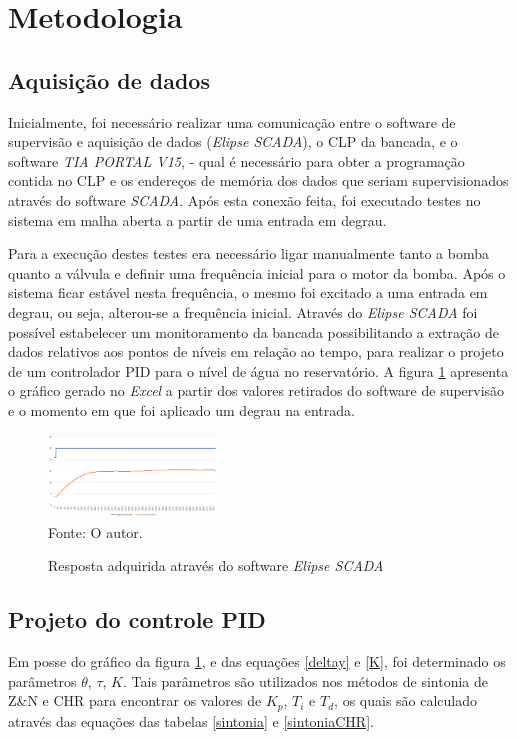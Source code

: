\documentclass[12 pt,conference]{IEEEtran}
\begin{document}
    
    \section{Metodologia}
    
    \subsection{Aquisição de dados}
    
    Inicialmente, foi necessário realizar uma comunicação entre o software de supervisão e aquisição de dados (\textit{Elipse SCADA}), o CLP da bancada, e o software \textit{TIA PORTAL V15}, - qual é necessário para obter a programação contida no CLP e os endereços de memória dos dados que seriam supervisionados através do software \textit{SCADA}. Após esta conexão feita, foi executado testes no sistema em malha aberta a partir de uma entrada em degrau.
    
    Para a execução destes testes era necessário ligar manualmente tanto a bomba quanto a válvula e definir uma frequência inicial para o motor da bomba. Após o sistema ficar estável nesta frequência, o mesmo foi excitado a uma entrada em degrau, ou seja, alterou-se a frequência inicial. Através do \textit{Elipse SCADA} foi possível estabelecer um monitoramento da bancada possibilitando a extração de dados relativos aos pontos de níveis em relação ao tempo, para realizar o projeto de um controlador PID para o nível de água no reservatório. A figura \ref{figura:dados} apresenta o gráfico gerado no \textit{Excel} a partir dos valores retirados do software de supervisão e o momento em que foi aplicado um degrau na entrada.
    
    \begin{figure}[!http]
       \centering
        \caption{Resposta adquirida através do software \textit{Elipse SCADA}}
        \includegraphics[width=0.4\textwidth]{imagens/dadosextraido.png}\\ 
        Fonte: O autor.
        \label{figura:dados}
    \end{figure}
    
    \subsection{Projeto do controle PID}
    Em posse do gráfico da figura \ref{figura:dados}, e das equações \ref{deltay} e \ref{K}, foi determinado os parâmetros $\theta$, $\tau$, $K$. Tais parâmetros são utilizados nos métodos de sintonia de Z\&N e CHR para encontrar os valores de $K_p$, $T_i$ e $T_d$, os quais são calculado através das equações das tabelas \ref{sintonia} e \ref{sintoniaCHR}.
    
\end{document}
